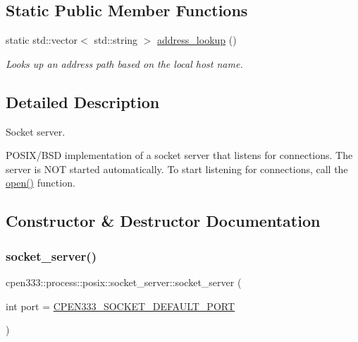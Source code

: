\subsection*{Static Public Member Functions}
\begin{DoxyCompactItemize}
\item 
static std\+::vector$<$ std\+::string $>$ \hyperlink{classcpen333_1_1process_1_1posix_1_1socket__server_a2ff19c8146dd6f5dcb72606311fffedd}{address\+\_\+lookup} ()
\begin{DoxyCompactList}\small\item\em Looks up an address path based on the local host name. \end{DoxyCompactList}\end{DoxyCompactItemize}


\subsection{Detailed Description}
Socket server. 

P\+O\+S\+I\+X/\+B\+SD implementation of a socket server that listens for connections. The server is N\+OT started automatically. To start listening for connections, call the \hyperlink{classcpen333_1_1process_1_1posix_1_1socket__server_a3da498856b5fb812e2e983561cf88944}{open()} function. 

\subsection{Constructor \& Destructor Documentation}
\mbox{\label{classcpen333_1_1process_1_1posix_1_1socket__server_a245c4208b3be5daf334e4123ba0836c7}} 
\subsubsection{\texorpdfstring{socket\+\_\+server()}{socket\_server()}}
{\footnotesize\ttfamily cpen333\+::process\+::posix\+::socket\+\_\+server\+::socket\+\_\+server (\begin{DoxyParamCaption}\item[{int}]{port = {\ttfamily \hyperlink{impl_2windows_2socket_8h_a5164d95d122c5161aceda0d59b962e2e}{C\+P\+E\+N333\+\_\+\+S\+O\+C\+K\+E\+T\+\_\+\+D\+E\+F\+A\+U\+L\+T\+\_\+\+P\+O\+RT}} }\end{DoxyParamCaption})\hspace{0.3cm}{\ttfamily [inline]}}



